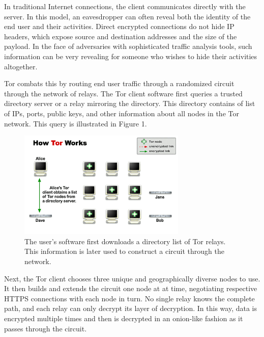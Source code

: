 In traditional Internet connections, the client communicates directly with the server. In this model, an eavesdropper can often reveal both the identity of the end user and their activities. Direct encrypted connections do not hide IP headers, which expose source and destination addresses and the size of the payload. In the face of adversaries with sophisticated traffic analysis tools, such information can be very revealing for someone who wishes to hide their activities altogether.

Tor combats this by routing end user traffic through a randomized circuit through the network of relays. The Tor client software first queries a trusted directory server or a relay mirroring the directory. This directory contains of list of IPs, ports, public keys, and other information about all nodes in the Tor network.\cite{Xin2009} This query is illustrated in Figure 1.

\begin{figure}[htbp]
\centering
\begin{minipage}{8 cm}
    \includegraphics[width=80mm]{images/circuit-building-1-9.png}
    \caption{The user's software first downloads a directory list of Tor relays. This information is later used to construct a circuit through the network.\cite{McCoy2008}}
\end{minipage}
\end{figure}

Next, the Tor client chooses three unique and geographically diverse nodes to use. It then builds and extends the circuit one node at at time, negotiating respective HTTPS connections with each node in turn. No single relay knows the complete path, and each relay can only decrypt its layer of decryption. In this way, data is encrypted multiple times and then is decrypted in an onion-like fashion as it passes through the circuit.


